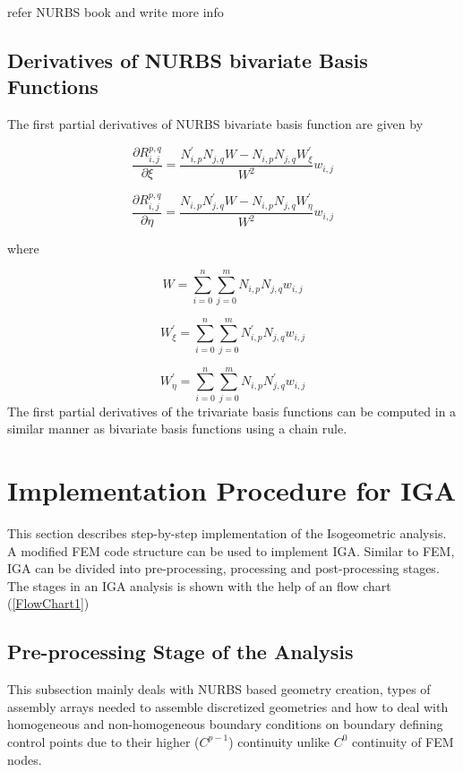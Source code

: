 \documentclass[12pt]{article}
\begin{document}
refer NURBS book and write more info

\subsection{Derivatives of NURBS bivariate Basis Functions}
The first partial derivatives of NURBS bivariate basis function are given by

\begin{equation}
\frac{\partial R_{i,j}^{p,q}}{\partial \xi} = \frac{N^{'}_{i,p} N_{j,q} W - N_{i,p} N_{j,q} W^{'}_{\xi}}{W^2}w_{i,j}
\end{equation}

\begin{equation}
\frac{\partial R_{i,j}^{p,q}}{\partial \eta} = \frac{N_{i,p} N^{'}_{j,q} W - N_{i,p} N_{j,q} W^{'}_{\eta}}{W^2}w_{i,j}
\end{equation}

\noindent
where

\begin{equation}
W = \sum_{i=0}^{n}\sum_{j=0}^{m}N_{i,p} N_{j,q}w_{i,j}
\end{equation}

\begin{equation}
W^{'}_{\xi} = \sum_{i=0}^{n}\sum_{j=0}^{m}N^{'}_{i,p} N_{j,q}w_{i,j}
\end{equation}

\begin{equation}
W^{'}_{\eta} = \sum_{i=0}^{n}\sum_{j=0}^{m}N_{i,p} N^{'}_{j,q}w_{i,j}
\end{equation}
The first partial derivatives of the trivariate basis functions can be computed in a similar manner as bivariate basis functions using a chain rule.



\section{Implementation Procedure for IGA}
This section describes step-by-step implementation of the Isogeometric analysis. A modified FEM code structure can be used to implement IGA. Similar to FEM, IGA can be divided into pre-processing, processing and post-processing stages. The stages in an IGA analysis is shown with the help of an flow chart (\ref{FlowChart1})


\subsection{Pre-processing Stage of the Analysis}
This subsection mainly deals with NURBS based geometry creation, types of assembly arrays needed to assemble discretized geometries and how to deal with homogeneous and non-homogeneous boundary conditions on boundary defining control points due to their higher ($C^{p-1}$) continuity unlike $C^{0}$ continuity of FEM nodes. 
\end{document}
